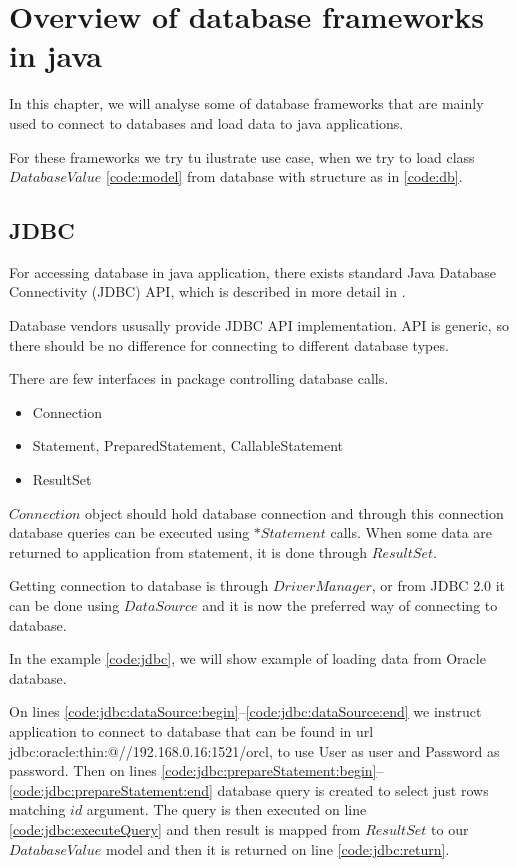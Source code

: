 
\chapter{Overview of database frameworks in java}

In this chapter, we will analyse some of database frameworks that are mainly used
to connect to databases and load data to java applications.

For these frameworks we try tu ilustrate use case, when we try to load
class $DatabaseValue$ \ref{code:model} from database with structure as in \ref{code:db}.








\section{JDBC}

For accessing database in java application, there exists standard Java Database Connectivity (JDBC) API,
which is described in more detail in \citet{JDBC_OVERVIEW}.

Database vendors ususally provide JDBC API implementation. API is generic, so
there should be no difference for connecting to different database types.

There are few interfaces in \citet{java.sql} package controlling database calls.
\begin{itemize}
  \item Connection
  \item Statement, PreparedStatement, CallableStatement
  \item ResultSet
\end{itemize}

$Connection$ object should hold database connection and through this connection
database queries can be executed using $*Statement$ calls.
When some data are returned to application from statement, it is done
through $ResultSet$.

Getting connection to database is through $DriverManager$, or from JDBC 2.0
it can be done using $DataSource$ and it is now the preferred way of connecting to database.

In the example \ref{code:jdbc}, we will show example of loading data from Oracle database.



On lines \ref{code:jdbc:dataSource:begin}--\ref{code:jdbc:dataSource:end} we instruct application
to connect to database that can be found in url jdbc:oracle:thin:@//192.168.0.16:1521/orcl,
to use User as user and Password as password.
Then on lines \ref{code:jdbc:prepareStatement:begin}--\ref{code:jdbc:prepareStatement:end}
database query is created to select just rows matching $id$ argument.
The query is then executed on line \ref{code:jdbc:executeQuery} and then
result is mapped from $ResultSet$ to our $DatabaseValue$ model and then it is returned on line \ref{code:jdbc:return}.


